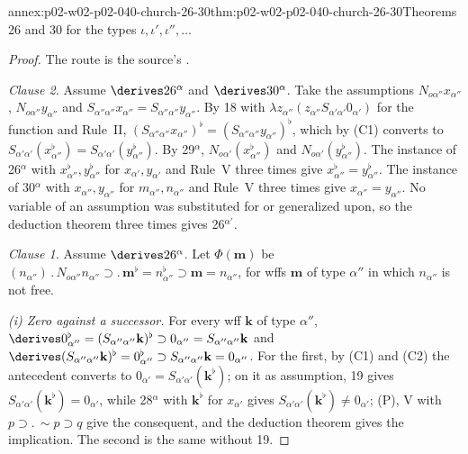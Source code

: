 \begin{annexitem}{annex:p02-w02-p02-040-church-26-30}{thm:p02-w02-p02-040-church-26-30}{Theorems 26 and 30 for the types \(\iota,\iota',\iota'',\ldots\)}
\begin{proof}
The route is the source's \cite[\S6, pp.~66--67]{Church1940}.

\emph{Clause 2.}  Assume \(\derives26^\alpha\) and \(\derives30^\alpha\).  Take
the assumptions \(N_{o\alpha''}x_{\alpha''}\), \(N_{o\alpha''}y_{\alpha''}\) and
\(S_{\alpha''\alpha''}x_{\alpha''}=S_{\alpha''\alpha''}y_{\alpha''}\).  By 18
with \(\lambda z_{\alpha''}(z_{\alpha''}S_{\alpha'\alpha'}0_{\alpha'})\) for the
function and Rule~II,
\((S_{\alpha''\alpha''}x_{\alpha''})^\flat=(S_{\alpha''\alpha''}y_{\alpha''})^\flat\),
which by (C1) converts to
\(S_{\alpha'\alpha'}(x_{\alpha''}^\flat)=S_{\alpha'\alpha'}(y_{\alpha''}^\flat)\).
By 29\(^\alpha\), \(N_{o\alpha'}(x_{\alpha''}^\flat)\) and
\(N_{o\alpha'}(y_{\alpha''}^\flat)\).  The instance of 26\(^\alpha\) with
\(x_{\alpha''}^\flat,y_{\alpha''}^\flat\) for \(x_{\alpha'},y_{\alpha'}\) and
Rule~V three times give \(x_{\alpha''}^\flat=y_{\alpha''}^\flat\).  The instance
of 30\(^\alpha\) with \(x_{\alpha''},y_{\alpha''}\) for \(m_{\alpha''},n_{\alpha''}\)
and Rule~V three times give \(x_{\alpha''}=y_{\alpha''}\).  No variable of an
assumption was substituted for or generalized upon, so the deduction theorem
three times gives 26\(^{\alpha'}\).

\emph{Clause 1.}  Assume \(\derives26^\alpha\).  Let \(\Phi(\mathbf m)\) be
\((n_{\alpha''})\,.\,N_{o\alpha''}n_{\alpha''}\supset.\,\mathbf m^\flat=n_{\alpha''}^\flat\supset\mathbf m=n_{\alpha''}\),
for wffs \(\mathbf m\) of type \(\alpha''\) in which \(n_{\alpha''}\) is not free.

\emph{(i) Zero against a successor.}  For every wff \(\mathbf k\) of type \(\alpha''\),
\(\derives0_{\alpha''}^\flat=(S_{\alpha''\alpha''}\mathbf k)^\flat\supset0_{\alpha''}=S_{\alpha''\alpha''}\mathbf k\)
and \(\derives(S_{\alpha''\alpha''}\mathbf k)^\flat=0_{\alpha''}^\flat\supset S_{\alpha''\alpha''}\mathbf k=0_{\alpha''}\).
For the first, by (C1) and (C2) the antecedent converts to
\(0_{\alpha'}=S_{\alpha'\alpha'}(\mathbf k^\flat)\); on it as assumption, 19 gives
\(S_{\alpha'\alpha'}(\mathbf k^\flat)=0_{\alpha'}\), while 28\(^\alpha\) with
\(\mathbf k^\flat\) for \(x_{\alpha'}\) gives
\(S_{\alpha'\alpha'}(\mathbf k^\flat)\neq0_{\alpha'}\); (P), V with
\(p\supset.\,\sim p\supset q\) give the consequent, and the deduction theorem
gives the implication.  The second is the same without 19.


\end{proof}
\end{annexitem}
